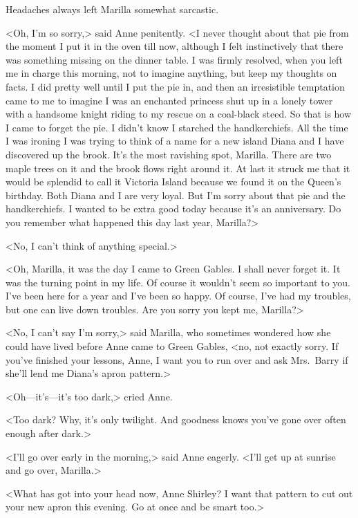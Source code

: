 Headaches always left Marilla somewhat sarcastic.

<Oh, I'm so sorry,> said Anne penitently. <I never thought about that pie from the moment I put it in the oven till now, although I felt instinctively that there was something missing on the dinner table. I was firmly resolved, when you left me in charge this morning, not to imagine anything, but keep my thoughts on facts. I did pretty well until I put the pie in, and then an irresistible temptation came to me to imagine I was an enchanted princess shut up in a lonely tower with a handsome knight riding to my rescue on a coal-black steed. So that is how I came to forget the pie. I didn't know I starched the handkerchiefs. All the time I was ironing I was trying to think of a name for a new island Diana and I have discovered up the brook. It's the most ravishing spot, Marilla. There are two maple trees on it and the brook flows right around it. At last it struck me that it would be splendid to call it Victoria Island because we found it on the Queen's birthday. Both Diana and I are very loyal. But I'm sorry about that pie and the handkerchiefs. I wanted to be extra good today because it's an anniversary. Do you remember what happened this day last year, Marilla?>

<No, I can't think of anything special.>

<Oh, Marilla, it was the day I came to Green Gables. I shall never forget it. It was the turning point in my life. Of course it wouldn't seem so important to you. I've been here for a year and I've been so happy. Of course, I've had my troubles, but one can live down troubles. Are you sorry you kept me, Marilla?>

<No, I can't say I'm sorry,> said Marilla, who sometimes wondered how she could have lived before Anne came to Green Gables, <no, not exactly sorry. If you've finished your lessons, Anne, I want you to run over and ask Mrs.~Barry if she'll lend me Diana's apron pattern.>

<Oh—it's—it's too dark,> cried Anne.

<Too dark? Why, it's only twilight. And goodness knows you've gone over often enough after dark.>

<I'll go over early in the morning,> said Anne eagerly. <I'll get up at sunrise and go over, Marilla.>

<What has got into your head now, Anne Shirley? I want that pattern to cut out your new apron this evening. Go at once and be smart too.>

